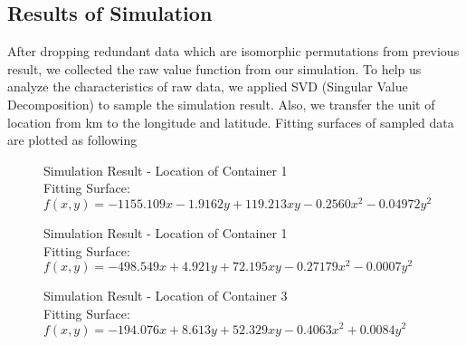 \documentclass[12pt]{article}
\begin{document}
		\subsection{Results of Simulation}
		After dropping redundant data which are isomorphic permutations from previous result, we collected the raw value function from our simulation. To help us analyze the characteristics of raw data, we applied SVD (Singular Value Decomposition) to sample the simulation result. Also, we transfer the unit of location from km to the longitude and latitude. Fitting surfaces of sampled data are plotted as following
		\begin{figure}[H]
			\centering
			\caption[Simulation Result - Location of Container 1]
					{Simulation Result - Location of Container 1 \\ Fitting Surface: $f(x, y) = -1155.109 x - 1.9162y +  119.213xy - 0.2560 x^2 - 0.04972y^2$\endtabular}
		\end{figure}
			
			
		\begin{figure}[H]
			\centering
			\caption[Simulation Result - Location of Container 2]
					{Simulation Result - Location of Container 1 \\ Fitting Surface: $f(x, y) =	-498.549 x +  4.921 y +  72.195 xy -0.27179 x^2  -0.0007 y^2$\endtabular}
		\end{figure}
			

		\begin{figure}[H]
			\centering
			\caption[Simulation Result - Location of Container 3]	
					{Simulation Result - Location of Container 3 \\ Fitting Surface: $f(x, y) = -194.076 x +  8.613 y +  52.329xy- 0.4063 x^2+0.0084 y^2$\endtabular}
		\end{figure}
			
\end{document}
